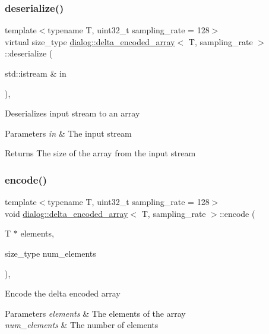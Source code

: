 \subsubsection{\texorpdfstring{deserialize()}{deserialize()}}
{\footnotesize\ttfamily template$<$typename T, uint32\+\_\+t sampling\+\_\+rate = 128$>$ \\
virtual size\+\_\+type \hyperlink{classdialog_1_1delta__encoded__array}{dialog\+::delta\+\_\+encoded\+\_\+array}$<$ T, sampling\+\_\+rate $>$\+::deserialize (\begin{DoxyParamCaption}\item[{std\+::istream \&}]{in }\end{DoxyParamCaption})\hspace{0.3cm}{\ttfamily [inline]}, {\ttfamily [virtual]}}

Deserializes input stream to an array 
\begin{DoxyParams}{Parameters}
{\em in} & The input stream \\
\hline
\end{DoxyParams}
\begin{DoxyReturn}{Returns}
The size of the array from the input stream 
\end{DoxyReturn}
\mbox{\label{classdialog_1_1delta__encoded__array_aaab973ffb4fa2d62fb658e5dbcc0acad}} 
\subsubsection{\texorpdfstring{encode()}{encode()}}
{\footnotesize\ttfamily template$<$typename T, uint32\+\_\+t sampling\+\_\+rate = 128$>$ \\
void \hyperlink{classdialog_1_1delta__encoded__array}{dialog\+::delta\+\_\+encoded\+\_\+array}$<$ T, sampling\+\_\+rate $>$\+::encode (\begin{DoxyParamCaption}\item[{T $\ast$}]{elements,  }\item[{size\+\_\+type}]{num\+\_\+elements }\end{DoxyParamCaption})\hspace{0.3cm}{\ttfamily [inline]}, {\ttfamily [protected]}}

Encode the delta encoded array 
\begin{DoxyParams}{Parameters}
{\em elements} & The elements of the array \\
\hline
{\em num\+\_\+elements} & The number of elements \\
\hline
\end{DoxyParams}
\mbox{\label{classdialog_1_1delta__encoded__array_a4ad7e0110c90c91684873f40c778cd6e}} 
